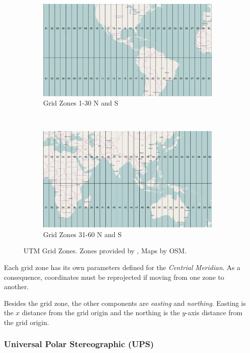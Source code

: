 \begin{figure}[h!]
\centering
\begin{subfigure}[c]{4.2in}
\includegraphics[width=4.2in]{chapter1/diagrams/figure_1_3.png}
\caption{Grid Zones 1-30 N and S}
\end{subfigure}\\
\begin{subfigure}[c]{4.2in}
\includegraphics[width=4.2in]{chapter1/diagrams/figure_1_4.png}
\caption{Grid Zones 31-60 N and S}
\end{subfigure}
\caption{UTM Grid Zones. Zones provided by \cite{NGA_SIG_UTM_UPS}, Maps by OSM.}
\end{figure}

Each grid zone has its own parameters defined for the \emph{Centrial Meridian}.
As a consequence, coordinates must be reprojected if moving from one zone to another.

Besides the grid zone, the other components are \emph{easting} and \emph{northing}.
Easting is the $x$ distance from the grid origin and the northing is the $y$-axis
distance from the grid origin.  


\subsubsection*{Universal Polar Stereographic (UPS)}






